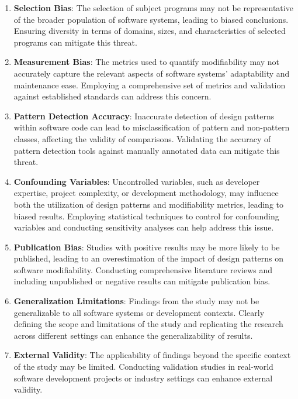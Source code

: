 \documentclass[conference]{IEEEtran}
\begin{document}
	\begin{enumerate}
		\item \textbf{Selection Bias}: The selection of subject programs may not be representative of the broader population of software systems, leading to biased conclusions. Ensuring diversity in terms of domains, sizes, and characteristics of selected programs can mitigate this threat.
		
		\item \textbf{Measurement Bias}: The metrics used to quantify modifiability may not accurately capture the relevant aspects of software systems' adaptability and maintenance ease. Employing a comprehensive set of metrics and validation against established standards can address this concern.
		
		\item \textbf{Pattern Detection Accuracy}: Inaccurate detection of design patterns within software code can lead to misclassification of pattern and non-pattern classes, affecting the validity of comparisons. Validating the accuracy of pattern detection tools against manually annotated data can mitigate this threat.
		
		\item \textbf{Confounding Variables}: Uncontrolled variables, such as developer expertise, project complexity, or development methodology, may influence both the utilization of design patterns and modifiability metrics, leading to biased results. Employing statistical techniques to control for confounding variables and conducting sensitivity analyses can help address this issue.
		
		\item \textbf{Publication Bias}: Studies with positive results may be more likely to be published, leading to an overestimation of the impact of design patterns on software modifiability. Conducting comprehensive literature reviews and including unpublished or negative results can mitigate publication bias.
		
		\item \textbf{Generalization Limitations}: Findings from the study may not be generalizable to all software systems or development contexts. Clearly defining the scope and limitations of the study and replicating the research across different settings can enhance the generalizability of results.
		
		\item \textbf{External Validity}: The applicability of findings beyond the specific context of the study may be limited. Conducting validation studies in real-world software development projects or industry settings can enhance external validity.
	\end{enumerate}
	
\end{document}
